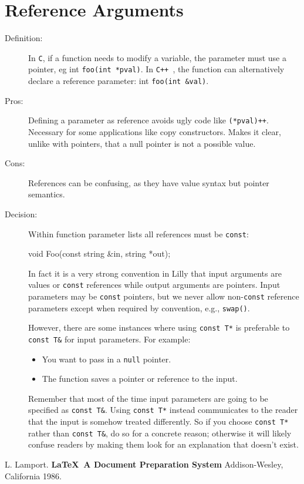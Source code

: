 \documentclass[12pt,reqno]{book}      %
\def\Cpp{\texttt{C++ }}
\begin{document}
\section{Reference Arguments}
\begin{description}
\item[Definition:] In \texttt{C}, if a function needs to modify a variable, the parameter must use a pointer, eg int \texttt{foo(int *pval)}. In \Cpp, the function can alternatively declare a reference parameter: int \texttt{foo(int \&val)}.
\item[Pros:] Defining a parameter as reference avoids ugly code like \texttt{(*pval)++}. Necessary for some applications like copy constructors. Makes it clear, unlike with pointers, that a null pointer is not a possible value.
\item[Cons:] 	References can be confusing, as they have value syntax but pointer semantics.
\item[Decision:] Within function parameter lists all references must be \texttt{const}:
\begin{Code}
void Foo(const string &in, string *out);
\end{Code}
In fact it is a very strong convention in Lilly that input arguments are values or \texttt{const} references while output arguments are pointers. Input parameters may be \texttt{const} pointers, but we never allow non-\texttt{const} reference parameters except when required by convention, e.g., \texttt{swap()}.

However, there are some instances where using \texttt{const T*} is preferable to \texttt{const T\&} for input parameters. For example:
\begin{itemize}
	\item You want to pass in a \texttt{null} pointer.
	\item The function saves a pointer or reference to the input.
\end{itemize}
Remember that most of the time input parameters are going to be specified as \texttt{const T\&}. Using \texttt{const T*} instead communicates to the reader that the input is somehow treated differently. So if you choose \texttt{const T*} rather than \texttt{const T\&}, do so for a concrete reason; otherwise it will likely confuse readers by making them look for an explanation that doesn't exist.
\end{description}	

%
%

\begin{thebibliography}{99}
 L. Lamport. {\bf \LaTeX \ A Document Preparation System}
Addison-Wesley, California 1986.
\end{thebibliography}


\end{document}
